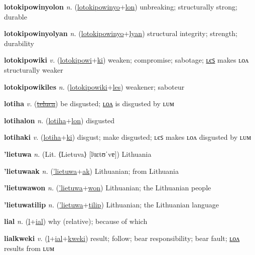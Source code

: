 \textbf{\hypertarget{lotokipowinyolon}{lotokipowinyolon}} \textit{n.} (\hyperlink{lotokipowinyo}{lotokipowinyo}+\allowbreak \hyperlink{lon}{lon})
unbreaking; structurally strong; durable

\textbf{\hypertarget{lotokipowinyolyan}{lotokipowinyolyan}} \textit{n.} (\hyperlink{lotokipowinyo}{lotokipowinyo}+\allowbreak \hyperlink{lyan}{lyan})
structural integrity; strength; durability

\textbf{\hypertarget{lotokipowiki}{lotokipowiki}} \textit{v.} (\hyperlink{lotokipowi}{lotokipowi}+\allowbreak \hyperlink{ki}{ki})
weaken; compromise; sabotage; \hyperlink{lotokipowikiles}{ʟєꜱ} makes ʟᴏᴧ structurally weaker

\textbf{\hypertarget{lotokipowikiles}{lotokipowikiles}} \textit{n.} (\hyperlink{lotokipowiki}{lotokipowiki}+\allowbreak \hyperlink{les}{les})
weakener; saboteur

\textbf{\hypertarget{lotiha}{lotiha}} \textit{v.} (\hyperlink{teluca}{\sout{teluca}})
be disgusted; \hyperlink{lotihalon}{ʟᴏᴧ} is disgusted by ʟᴜᴍ

\textbf{\hypertarget{lotihalon}{lotihalon}} \textit{n.} (\hyperlink{lotiha}{lotiha}+\allowbreak \hyperlink{lon}{lon})
disgusted

\textbf{\hypertarget{lotihaki}{lotihaki}} \textit{v.} (\hyperlink{lotiha}{lotiha}+\allowbreak \hyperlink{ki}{ki})
disgust; make disgusted; ʟєꜱ makes ʟᴏᴧ disgusted by ʟᴜᴍ

\textbf{\hypertarget{'lietuwa}{'lietuwa}} \textit{n.} (Lit. ⟨Lietuva⟩ [lʲɪɛtʊˈvɐ])
Lithuania

\textbf{\hypertarget{'lietuwaak}{'lietuwaak}} \textit{n.} (\hyperlink{'lietuwa}{'lietuwa}+\allowbreak \hyperlink{ak}{ak})
Lithuanian; from Lithuania

\textbf{\hypertarget{'lietuwawon}{'lietuwawon}} \textit{n.} (\hyperlink{'lietuwa}{'lietuwa}+\allowbreak \hyperlink{won}{won})
Lithuanian; the Lithuanian people

\textbf{\hypertarget{'lietuwatilip}{'lietuwatilip}} \textit{n.} (\hyperlink{'lietuwa}{'lietuwa}+\allowbreak \hyperlink{tilip}{tilip})
Lithuanian; the Lithuanian language

\textbf{\hypertarget{lial}{lial}} \textit{n.} (\hyperlink{l}{l}+\allowbreak \hyperlink{ial}{ial})
why (relative); because of which

\textbf{\hypertarget{lialkweki}{lialkweki}} \textit{v.} (\hyperlink{l}{l}+\allowbreak \hyperlink{ial}{ial}+\allowbreak \hyperlink{kweki}{kweki})
result; follow; bear responsibility; bear fault; \hyperlink{lialkwekilon}{ʟᴏᴧ} results from ʟᴜᴍ

